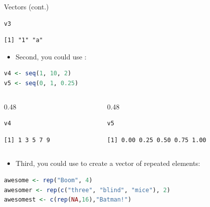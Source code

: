 \begin{frame}[fragile]{Vectors (cont.)}
\begin{lstlisting}[language=R]
v3
\end{lstlisting}
\begin{lstlisting}[style=output]
[1] "1" "a"
\end{lstlisting}
\begin{itemize}
  \item Second, you could use :
\end{itemize}
\begin{lstlisting}[language=R]
v4 <- seq(1, 10, 2)
v5 <- seq(0, 1, 0.25)
\end{lstlisting}
\begin{columns}[T]
\begin{column}{0.48\textwidth}
\begin{lstlisting}[language=R]
v4
\end{lstlisting}
\begin{lstlisting}[style=output]
[1] 1 3 5 7 9
\end{lstlisting}
\end{column}
\begin{column}{0.48\textwidth}
\begin{lstlisting}[language=R]
v5
\end{lstlisting}
\begin{lstlisting}[style=output]
[1] 0.00 0.25 0.50 0.75 1.00
\end{lstlisting}
\end{column}
\end{columns}
\begin{itemize}
  \item Third, you could use  to create a vector of repeated elements:
\end{itemize}
\begin{lstlisting}[language=R]
awesome <- rep("Boom", 4)
awesomer <- rep(c("three", "blind", "mice"), 2)
awesomest <- c(rep(NA,16),"Batman!")
\end{lstlisting}
\end{frame}

